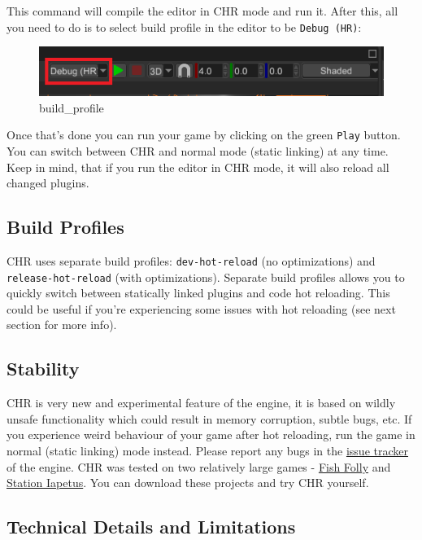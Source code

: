\documentclass[
]{book}
\theoremstyle{definition}
\theoremstyle{definition}
\theoremstyle{definition}
\theoremstyle{definition}
\theoremstyle{remark}
\begin{document}
This command will compile the editor in CHR mode and run it. After this, all you need to do is to select build profile in the editor to be \texttt{Debug\ (HR)}:

\begin{figure}
\centering
\includegraphics{images/beginning_build_profile.png}
\caption{build\_profile}
\end{figure}

Once that's done you can run your game by clicking on the green \texttt{Play} button. You can switch between CHR and normal mode (static linking) at any time. Keep in mind, that if you run the editor in CHR mode, it will also reload all changed plugins.

\subsection{Build Profiles}\label{build-profiles}

CHR uses separate build profiles: \texttt{dev-hot-reload} (no optimizations) and \texttt{release-hot-reload} (with optimizations). Separate build profiles allows you to quickly switch between statically linked plugins and code hot reloading. This could be useful if you're experiencing some issues with hot reloading (see next section for more info).

\subsection{Stability}\label{stability}

CHR is very new and experimental feature of the engine, it is based on wildly unsafe functionality which could result in memory corruption, subtle bugs, etc. If you experience weird behaviour of your game after hot reloading, run the game in normal (static linking) mode instead. Please report any bugs in the \href{https://github.com/FyroxEngine/Fyrox/issues}{issue tracker} of the engine. CHR was tested on two relatively large games - \href{https://github.com/mrDIMAS/FishFolly}{Fish Folly} and \href{https://github.com/mrDIMAS/StationIapetus}{Station Iapetus}. You can download these projects and try CHR yourself.

\subsection{Technical Details and Limitations}\label{technical-details-and-limitations}
\end{document}
